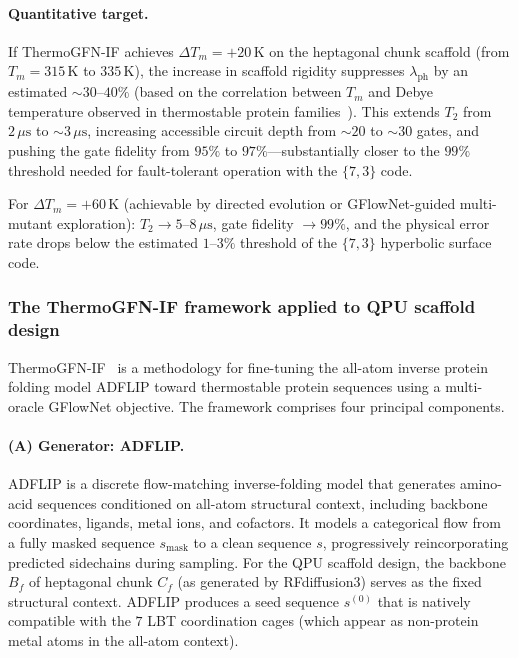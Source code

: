 \documentclass[11pt,oneside]{amsbook}
\numberwithin{equation}{section}
\theoremstyle{plain}
\theoremstyle{definition}
\theoremstyle{remark}
\begin{document}
\paragraph{Quantitative target.}
If ThermoGFN-IF achieves $\Delta T_m = +20\,\text{K}$ on the heptagonal
chunk scaffold (from $T_m = 315\,\text{K}$ to $335\,\text{K}$), the increase
in scaffold rigidity suppresses $\lambda_{\mathrm{ph}}$ by an estimated
$\sim 30$--$40\%$ (based on the correlation between $T_m$ and Debye
temperature observed in thermostable protein families~\cite{ZaccaiEtAl2016}).
This extends $T_2$ from $2\,\mu\text{s}$ to $\sim 3\,\mu\text{s}$, increasing
accessible circuit depth from $\sim 20$ to $\sim 30$ gates, and pushing the
gate fidelity from $95\%$ to $97\%$---substantially closer to the
$99\%$ threshold needed for fault-tolerant operation with the $\{7,3\}$
code.

For $\Delta T_m = +60\,\text{K}$ (achievable by directed evolution or
GFlowNet-guided multi-mutant exploration): $T_2 \to 5$--$8\,\mu\text{s}$,
gate fidelity $\to 99\%$, and the physical error rate drops below the
estimated $1$--$3\%$ threshold of the $\{7,3\}$ hyperbolic surface code.

\subsubsection{The ThermoGFN-IF framework applied to QPU scaffold design}

ThermoGFN-IF~\cite{SchreiberThermoGFN2025} is a methodology for
fine-tuning the all-atom inverse protein folding model ADFLIP toward
thermostable protein sequences using a multi-oracle GFlowNet objective.  The
framework comprises four principal components.

\paragraph{(A) Generator: ADFLIP.}
ADFLIP is a discrete flow-matching inverse-folding model that generates
amino-acid sequences conditioned on all-atom structural context, including
backbone coordinates, ligands, metal ions, and cofactors.  It models a
categorical flow from a fully masked sequence $s_{\mathrm{mask}}$ to a clean
sequence $s$, progressively reincorporating predicted sidechains during
sampling.  For the QPU scaffold design, the backbone $B_f$ of heptagonal
chunk $C_f$ (as generated by RFdiffusion3) serves as the fixed structural
context.  ADFLIP produces a seed sequence $s^{(0)}$ that is natively
compatible with the $7$ LBT coordination cages (which appear as non-protein
metal atoms in the all-atom context).
\end{document}
